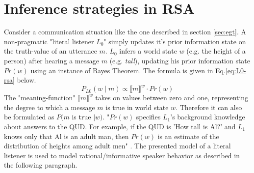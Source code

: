 \section{Inference strategies in RSA}
Consider a communication situation like the one described in section \ref{sec:egt}. A non-pragmatic "literal listener $L_0$" simply updates it's prior information state on the truth-value of an utterance $m$. $L_0$ infers a world state $w$ (e.g. the height of a person) after hearing a message $m$ (e.g. \textit{tall}), updating his prior information state $Pr(w)$ using an instance of Bayes Theorem. The formula is given in Eq.\ref{eq:L0-rsa} below.
\begin{equation}
\label{eq:L0-rsa}
P_{L0}(w \mid m) \propto \llbracket m \rrbracket^w \cdot Pr(w) 
\end{equation}
The "meaning-function" $\llbracket m \rrbracket^w$ takes on values between zero and one, representing the degree to which a message $m$ is true in world state $w$. Therefore it can also be formulated as $P(m $ is true $ \mid w)$.
"$Pr(w)$ specifies $L_1$'s background knowledge about answers to the QUD. For
example, if the QUD is 'How tall is Al?' and $L_1$ knows only that Al is an adult man,
then $Pr(w)$ is an estimate of the distribution of heights among adult men" \citep{lassiter2013context}. The presented model of a literal listener is used to model rational/informative speaker behavior as described in the following paragraph.\\

